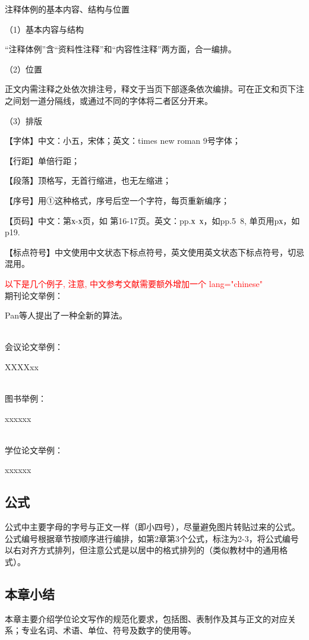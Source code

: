 注释体例的基本内容、结构与位置

（1）基本内容与结构

“注释体例”含“资料性注释”和“内容性注释”两方面，合一编排。

（2）位置

正文内需注释之处依次排注号，释文于当页下部逐条依次编排。可在正文和页下注之间划一道分隔线，或通过不同的字体将二者区分开来。

（3）排版

【字体】中文：小五，宋体；英文：times new roman 9号字体；

【行距】单倍行距；

【段落】顶格写，无首行缩进，也无左缩进；

【序号】用①这种格式，序号后空一个字符，每页重新编序；

【页码】中文：第х-х页，如 第16-17页。英文：pp.х~х，如pp.5~8, 单页用pх，如p19.

【标点符号】中文使用中文状态下标点符号，英文使用英文状态下标点符号，切忌混用。

\textcolor{red}{以下是几个例子, 注意, 中文参考文献需要额外增加一个 lang="chinese"}
~\\
期刊论文举例：

Pan等人提出了一种全新的算法\cite{pan2018classification, pan2014cell, song2013asynchronous, lin2022adaptive}。

~\\
会议论文举例：

XXXXxx\cite{li2021large}

~\\
图书举例：

xxxxxx\cite{shavlik1990readings, yan2006CFG}

~\\
学位论文举例：

xxxxxx\cite{jxd1996, CCPT}




\subsection{公式}
公式中主要字母的字号与正文一样（即小四号），尽量避免图片转贴过来的公式。公式编号根据章节按顺序进行编排，如第2章第3个公式，标注为2-3，将公式编号以右对齐方式排列，但注意公式是以居中的格式排列的（类似教材中的通用格式）。

\subsection{本章小结}
本章主要介绍学位论文写作的规范化要求，包括图、表制作及其与正文的对应关系；专业名词、术语、单位、符号及数字的使用等。




